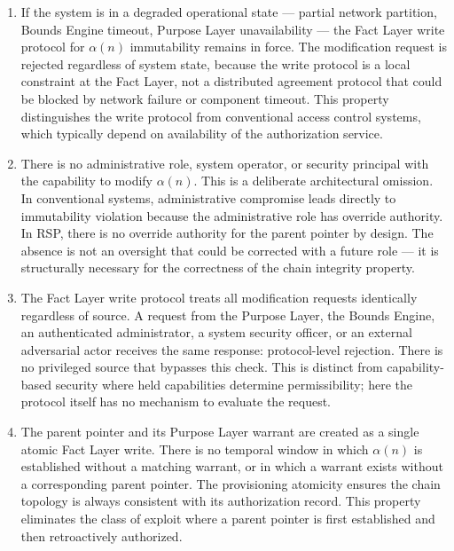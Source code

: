 \begin{enumerate}
    \item[(I1) \textbf{Failure-state resilience}] If the system is in a degraded operational state --- partial network partition, Bounds Engine timeout, Purpose Layer unavailability --- the Fact Layer write protocol for $\alpha(n)$ immutability remains in force. The modification request is rejected regardless of system state, because the write protocol is a local constraint at the Fact Layer, not a distributed agreement protocol that could be blocked by network failure or component timeout. This property distinguishes the write protocol from conventional access control systems, which typically depend on availability of the authorization service.

    \item[(I2) \textbf{Administrative override absence}] There is no administrative role, system operator, or security principal with the capability to modify $\alpha(n)$. This is a deliberate architectural omission. In conventional systems, administrative compromise leads directly to immutability violation because the administrative role has override authority. In RSP, there is no override authority for the parent pointer by design. The absence is not an oversight that could be corrected with a future role --- it is structurally necessary for the correctness of the chain integrity property.

    \item[(I3) \textbf{Source-equivalence of rejection}] The Fact Layer write protocol treats all modification requests identically regardless of source. A request from the Purpose Layer, the Bounds Engine, an authenticated administrator, a system security officer, or an external adversarial actor receives the same response: protocol-level rejection. There is no privileged source that bypasses this check. This is distinct from capability-based security where held capabilities determine permissibility; here the protocol itself has no mechanism to evaluate the request.

    \item[(I4) \textbf{Atomic warrant-pointer creation}] The parent pointer and its Purpose Layer warrant are created as a single atomic Fact Layer write. There is no temporal window in which $\alpha(n)$ is established without a matching warrant, or in which a warrant exists without a corresponding parent pointer. The provisioning atomicity ensures the chain topology is always consistent with its authorization record. This property eliminates the class of exploit where a parent pointer is first established and then retroactively authorized.
\end{enumerate}

